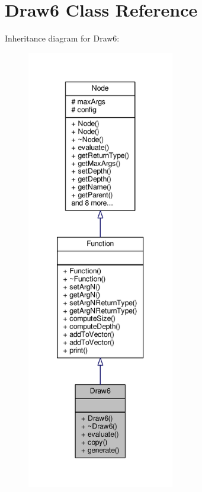 \hypertarget{classDraw6}{}\section{Draw6 Class Reference}
\label{classDraw6}


Inheritance diagram for Draw6\+:
\nopagebreak
\begin{figure}[H]
\begin{center}
\leavevmode
\includegraphics[height=550pt]{classDraw6__inherit__graph}
\end{center}
\end{figure}


